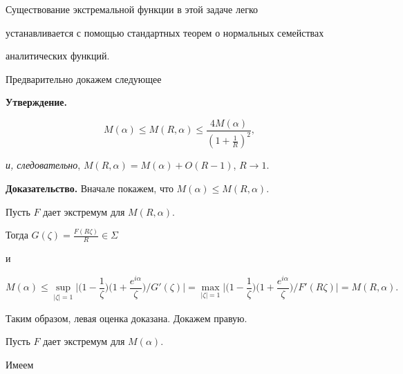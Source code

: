 Существование экстремальной функции в этой задаче легко


устанавливается с помощью стандартных теорем о нормальных семействах


аналитических функций.





Предварительно докажем следующее


\medskip





{\bf Утверждение.}


$$


M(\alpha) \leq M(R,\alpha) \leq \frac{4M(\alpha)}{(1+\frac{1}{R})^2},


$$


{\it и, следовательно}, $M(R,\alpha)=M(\alpha)+O(R-1)$, $R \to 1$.


\medskip





{\bf Доказательство.} Вначале покажем, что $M(\alpha) \leq M(R,\alpha)$.


Пусть $F$ дает экстремум для $M(R,\alpha)$.


Тогда $G(\zeta)=\frac{F(R\zeta)}{R} \in \Sigma$


и


$$


M(\alpha) \leq


\sup_{|\zeta|=1}\bigg|\bigg(1-\frac{1}{\zeta}\bigg)\bigg(1+


\frac{e^{i\alpha}}{\zeta}\bigg)/


G'(\zeta)\bigg| =\max_{|\zeta|=1}


\bigg|\bigg(1-\frac{1}{\zeta}\bigg)\bigg(1+\frac{e^{i\alpha}}{\zeta}\bigg)/


F'(R\zeta)\bigg| = M(R,\alpha).


$$


Таким образом, левая оценка доказана. Докажем правую.


Пусть $F$ дает экстремум для $M(\alpha)$.


Имеем


